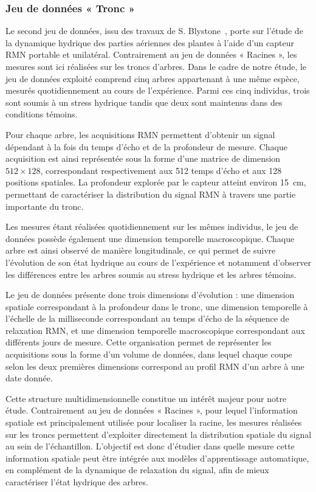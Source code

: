 \documentclass[12pt,a4paper,twoside]{article}
\begin{document}
\subsubsection{Jeu de données « Tronc »}

Le second jeu de données, issu des travaux de S. Blystone~\cite{Shannan}, porte sur l'étude de la dynamique hydrique des parties aériennes des plantes à l'aide d'un capteur RMN portable et unilatéral. Contrairement au jeu de données « Racines », les mesures sont ici réalisées sur les troncs d'arbres. Dans le cadre de notre étude, le jeu de données exploité comprend cinq arbres appartenant à une même espèce, mesurés quotidiennement au cours de l'expérience. Parmi ces cinq individus, trois sont soumis à un stress hydrique tandis que deux sont maintenus dans des conditions témoins.

Pour chaque arbre, les acquisitions RMN permettent d'obtenir un signal dépendant à la fois du temps d'écho et de la profondeur de mesure. Chaque acquisition est ainsi représentée sous la forme d'une matrice de dimension $512 \times 128$, correspondant respectivement aux \num{512} temps d'écho et aux \num{128} positions spatiales. La profondeur explorée par le capteur atteint environ \num{15}~cm, permettant de caractériser la distribution du signal RMN à travers une partie importante du tronc.

Les mesures étant réalisées quotidiennement sur les mêmes individus, le jeu de données possède également une dimension temporelle macroscopique. Chaque arbre est ainsi observé de manière longitudinale, ce qui permet de suivre l'évolution de son état hydrique au cours de l'expérience et notamment d'observer les différences entre les arbres soumis au stress hydrique et les arbres témoins.

Le jeu de données présente donc trois dimensions d'évolution : une dimension spatiale correspondant à la profondeur dans le tronc, une dimension temporelle à l'échelle de la milliseconde correspondant au temps d'écho de la séquence de relaxation RMN, et une dimension temporelle macroscopique correspondant aux différents jours de mesure. Cette organisation permet de représenter les acquisitions sous la forme d'un volume de données, dans lequel chaque coupe selon les deux premières dimensions correspond au profil RMN d'un arbre à une date donnée.

Cette structure multidimensionnelle constitue un intérêt majeur pour notre étude. Contrairement au jeu de données « Racines », pour lequel l'information spatiale est principalement utilisée pour localiser la racine, les mesures réalisées sur les troncs permettent d'exploiter directement la distribution spatiale du signal au sein de l'échantillon. L'objectif est donc d'étudier dans quelle mesure cette information spatiale peut être intégrée aux modèles d'apprentissage automatique, en complément de la dynamique de relaxation du signal, afin de mieux caractériser l'état hydrique des arbres.
\end{document}
